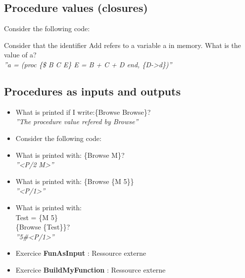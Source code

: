 \documentclass[fr,license=none]{../../../eplsummary}
\begin{document}
		\subsection{Procedure values (closures)}
			Consider the following code:
			
			Consider that the identifier Add refers to a variable a in memory. What is the value of a?\\
				\textit{''a = (proc \{\$ B C E\} E = B + C + D end, \{D->d\})''}
		\subsection{Procedures as inputs and outputs}
			\begin{itemize}
				\item What is printed if I write:\{Browse Browse\}?\\
					\textit{''The procedure value refered by Browse''}
				\item Consider the following code:
				
				\item What is printed with: \{Browse M\}?\\
					\textit{''<P/2 M>''}
				\item What is printed with: \{Browse \{M 5\}\}\\
					\textit{''<P/1>''}
				\item What is printed with:\\
				Test = \{M 5\}\\
				\{Browse \{Test\}\}?\\
					\textit{''5\#<P/1>''}
				\item Exercice \textbf{FunAsInput} : Ressource externe\\
				
				\item Exercice \textbf{BuildMyFunction} : Ressource externe\\
				
			\end{itemize}
\end{document}
